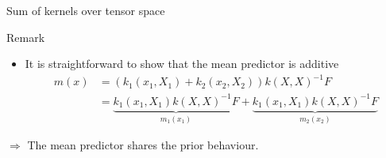 \documentclass{beamer}
\begin{document}
\begin{frame}{Sum of kernels over tensor space}
\begin{block}{Remark}%
\begin{itemize}
\item It is straightforward to show that the mean predictor is additive
\begin{equation*}
\begin{split}
m(x) & = (k_1(x_1,X_1)+k_2(x_2,X_2)) k(X,X)^{-1} F \\
& = \underbrace{k_1(x_1,X_1) k(X,X)^{-1} F}_{m_1(x_1)} + \underbrace{k_1(x_1,X_1) k(X,X)^{-1} F}_{m_2(x_2)}
\end{split}
\end{equation*}
\end{itemize}
\end{block}
\vspace{5mm}
\begin{block}{}
\alert{ $\Rightarrow$ The mean predictor shares the prior behaviour.}
\end{block}
\vfill \
\vspace{2cm} \
\end{frame}
\end{document}
